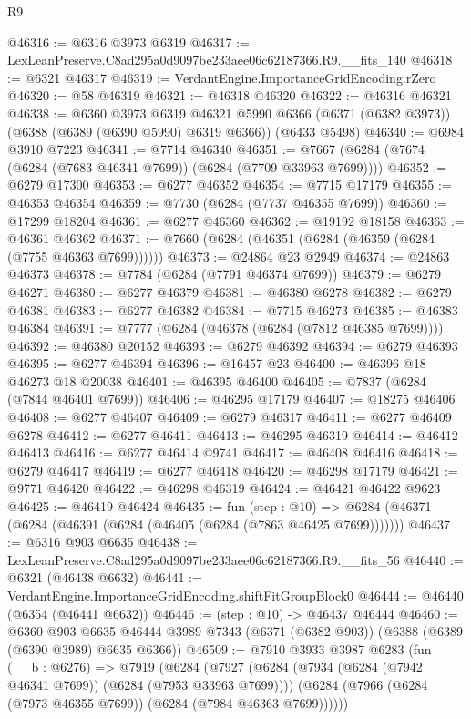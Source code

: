 \begin{lexlean}{R9}
\begin{coremodule}
@46316 := @6316 @3973 @6319
@46317 := LexLeanPreserve.C8ad295a0d9097be233aee06c62187366.R9.__fits_140
@46318 := @6321 @46317
@46319 := VerdantEngine.ImportanceGridEncoding.rZero
@46320 := @58 @46319
@46321 := @46318 @46320
@46322 := @46316 @46321
@46338 := @6360
    @3973
    @6319
    @46321
    @5990
    @6366
    (@6371 (@6382 @3973))
    (@6388 (@6389 (@6390 @5990) @6319 @6366))
    (@6433 @5498)
@46340 := @6984 @3910 @7223
@46341 := @7714 @46340
@46351 := @7667 (@6284 (@7674 (@6284 (@7683 @46341 @7699)) (@6284 (@7709 @33963 @7699))))
@46352 := @6279 @17300
@46353 := @6277 @46352
@46354 := @7715 @17179
@46355 := @46353 @46354
@46359 := @7730 (@6284 (@7737 @46355 @7699))
@46360 := @17299 @18204
@46361 := @6277 @46360
@46362 := @19192 @18158
@46363 := @46361 @46362
@46371 := @7660 (@6284 (@46351 (@6284 (@46359 (@6284 (@7755 @46363 @7699))))))
@46373 := @24864 @23 @2949
@46374 := @24863 @46373
@46378 := @7784 (@6284 (@7791 @46374 @7699))
@46379 := @6279 @46271
@46380 := @6277 @46379
@46381 := @46380 @6278
@46382 := @6279 @46381
@46383 := @6277 @46382
@46384 := @7715 @46273
@46385 := @46383 @46384
@46391 := @7777 (@6284 (@46378 (@6284 (@7812 @46385 @7699))))
@46392 := @46380 @20152
@46393 := @6279 @46392
@46394 := @6279 @46393
@46395 := @6277 @46394
@46396 := @16457 @23
@46400 := @46396 @18 @46273 @18 @20038
@46401 := @46395 @46400
@46405 := @7837 (@6284 (@7844 @46401 @7699))
@46406 := @46295 @17179
@46407 := @18275 @46406
@46408 := @6277 @46407
@46409 := @6279 @46317
@46411 := @6277 @46409 @6278
@46412 := @6277 @46411
@46413 := @46295 @46319
@46414 := @46412 @46413
@46416 := @6277 @46414 @9741
@46417 := @46408 @46416
@46418 := @6279 @46417
@46419 := @6277 @46418
@46420 := @46298 @17179
@46421 := @9771 @46420
@46422 := @46298 @46319
@46424 := @46421 @46422 @9623
@46425 := @46419 @46424
@46435 := fun (step : @10) =>
  @6284 (@46371 (@6284 (@46391 (@6284 (@46405 (@6284 (@7863 @46425 @7699)))))))
@46437 := @6316 @903 @6635
@46438 := LexLeanPreserve.C8ad295a0d9097be233aee06c62187366.R9.__fits_56
@46440 := @6321 (@46438 @6632)
@46441 := VerdantEngine.ImportanceGridEncoding.shiftFitGroupBlock0
@46444 := @46440 (@6354 (@46441 @6632))
@46446 := (step : @10) -> @46437 @46444
@46460 := @6360
    @903
    @6635
    @46444
    @3989
    @7343
    (@6371 (@6382 @903))
    (@6388 (@6389 (@6390 @3989) @6635 @6366))
@46509 := @7910
    @3933
    @3987
    @6283
    (fun (__b : @6276) =>
    @7919
      (@6284
        (@7927
          (@6284 (@7934 (@6284 (@7942 @46341 @7699)) (@6284 (@7953 @33963 @7699))))
          (@6284 (@7966 (@6284 (@7973 @46355 @7699)) (@6284 (@7984 @46363 @7699))))))

\end{coremodule}
\end{lexlean}
